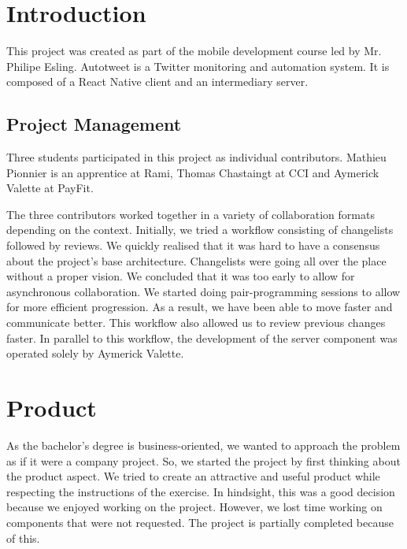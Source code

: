 \documentclass{report}
\begin{document}
\tableofcontents{}

\clearpage

\chapter{Introduction}

This project was created as part of the mobile development course led by Mr. Philipe Esling. Autotweet is a Twitter monitoring and automation system. It is composed of a React Native client and an intermediary server.

\section{Project Management}
Three students participated in this project as individual contributors. Mathieu Pionnier is an apprentice at Rami, Thomas Chastaingt at CCI and Aymerick Valette at PayFit. 

The three contributors worked together in a variety of collaboration formats depending on the context. Initially, we tried a workflow consisting of changelists followed by reviews. We quickly realised that it was hard to have a consensus about the project’s base architecture. Changelists were going all over the place without a proper vision. We concluded that it was too early to allow for asynchronous collaboration. We started doing pair-programming sessions to allow for more efficient progression. As a result, we have been able to move faster and communicate better. This workflow also allowed us to review previous changes faster. In parallel to this workflow, the development of the server component was operated solely by Aymerick Valette.

\clearpage

\chapter{Product}

As the bachelor's degree is business-oriented, we wanted to approach the problem as if it were a company project. So, we started the project by first thinking about the product aspect. We tried to create an attractive and useful product while respecting the instructions of the exercise. In hindsight, this was a good decision because we enjoyed working on the project. However, we lost time working on components that were not requested. The project is partially completed because of this.
\end{document}
